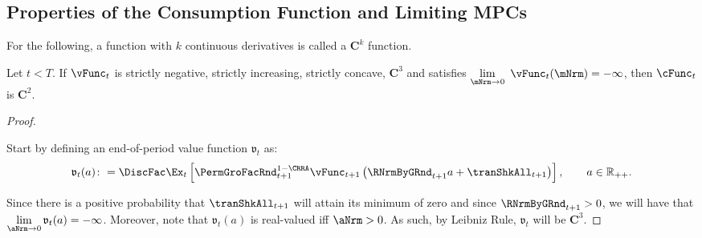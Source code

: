 \documentclass[\econtexRoot/BufferStockTheory]{subfiles}
\begin{document}
\subsection{Properties of the Consumption Function and Limiting MPCs}\label{sec:MPCiterproofs}

For the following, a function with $k$ continuous derivatives is called a $\mathbf{C}^{k}$ function.


\begin{lemma}\label{lemm:consC2}
Let $t<T$.
If $\vFunc_{t}$ is strictly negative, strictly increasing, strictly concave, $\mathbf{C}^{3}$ and satisfies $\lim\limits_{\mNrm\rightarrow 0}~\vFunc_{t}(\mNrm) =-\infty $, then $\cFunc_{t}$ is $\mathbf{C}^{2}$.
\end{lemma}


\begin{proof}

\hypertarget{BoroCnstNat}{}
%
Start by defining an end-of-period value function $\mathfrak{v}_{t}$ as:
%
\begin{equation}\label{eq:vfFrackdefn}
  \mathfrak{v}_{t}(a)\colon =\DiscFac \Ex_{t}\left[{\PermGroFacRnd}_{t+1}^{1-\CRRA}\vFunc_{t+1}\left({\RNrmByGRnd}_{t+1} a+{\tranShkAll}_{t+1}\right) \right], \qquad a\in \mathbb{R}_{++}. 
\end{equation}

Since there is a positive probability that $\tranShkAll_{t+1}$ will
attain its minimum of zero and since ${\RNrmByGRnd}_{t+1}>0$, we will have that $\lim\limits_{\aNrm \rightarrow 0} \mathfrak{v}_{t}(a) = -\infty$.
Moreover, note that
$\mathfrak{v}_{t}(a) $ is real-valued iff $\aNrm>0$.
As such, by Leibniz Rule,  $\mathfrak{v}_{t}$ will be $\mathbf{C}^{3}$.


\end{proof}
\end{document}
